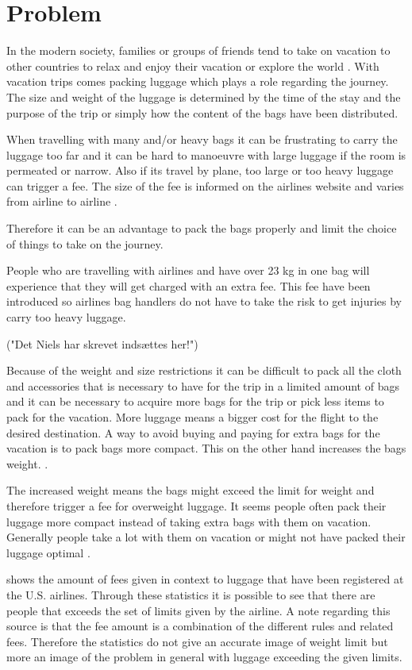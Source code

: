 \section{Problem}
In the modern society, families or groups of friends tend to take on vacation to other countries to relax and enjoy their vacation or explore the world \citep{danskecharter}.
With vacation trips comes packing luggage which plays a role regarding the journey. The size and weight of the luggage is determined by the time of the stay and the purpose of the trip or simply how the content of the bags have been distributed.

When travelling with many and/or heavy bags it can be frustrating to carry the luggage too far and it can be hard to manoeuvre with large luggage if the room is permeated or narrow. Also if its travel by plane, too large or too heavy luggage can trigger a fee. The size of the fee is informed on the airlines website and varies from airline to airline \citep{altombag}.

Therefore it can be an advantage to pack the bags properly and limit the choice of things to take on the journey.

People who are travelling with airlines and have over 23 kg in one bag will experience that they will get charged with an extra fee. This fee have been introduced so airlines bag handlers do not have to take the risk to get injuries by carry too heavy luggage.

("Det Niels har skrevet indsættes her!")

Because of the weight and size restrictions it can be difficult to pack all the cloth and accessories that is necessary to have for the trip in a limited amount of bags and it can be necessary to acquire more bags for the trip or pick less items to pack for the vacation. More luggage means a bigger cost for the flight to the desired destination. A way to avoid buying and paying for extra bags for the vacation is to pack bags more compact. This on the other hand increases the bags weight. \citep{altombag}.

The increased weight means the bags might exceed the limit for weight and therefore trigger a fee for overweight luggage.
It seems people often pack their luggage more compact instead of taking extra bags with them on vacation. Generally people take a lot with them on vacation or might not have packed their luggage optimal \citep{airstat}.

\citep{airstat} shows the amount of fees given in context to luggage that have been registered at the U.S. airlines. Through these statistics it is possible to see that there are people that exceeds the set of limits given by the airline. A note regarding this source is that the fee amount is a combination of the different rules and related fees. Therefore the statistics do not give an accurate image of weight limit but more an image of the problem in general with luggage exceeding the given limits.

